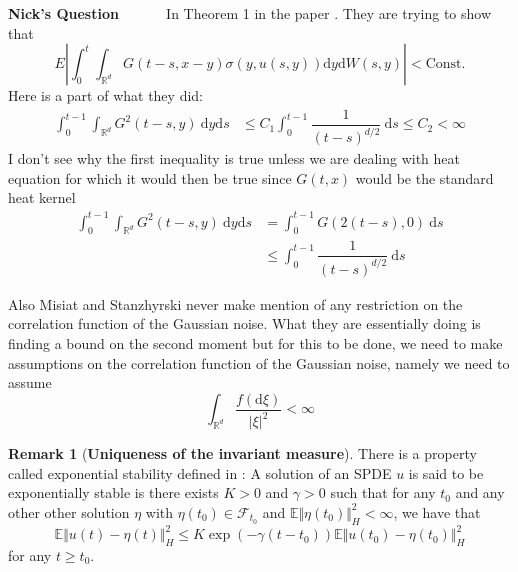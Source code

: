 \documentclass[a4paper,11pt]{article}
\theoremstyle{plain}
\theoremstyle{definition}
\newtheorem{remark}[theorem]{Remark}
\newcommand{\E}{\mathbb{E}}
\newcommand{\ud}{\ensuremath{\mathrm{d}}}
\newcommand{\R}{\mathbb{R}}
\newcounter{NQ}
\newenvironment{NickQuestion}[1][] %
  {\refstepcounter{NQ}
  \begin{mdframed}[backgroundcolor=lightgray]\textbf{Nick's Question \theNQ \: #1~~}~~~\noindent}%
  {\end{mdframed}}
\numberwithin{NQ}{section}
\numberwithin{LQ}{section}
\numberwithin{ZQ}{section}
\begin{document}
\begin{NickQuestion}
In Theorem 1 in the paper \cite{MSY16}. They are trying to show that
$$ E\left|\int_0^t\int_{\R^d}G(t-s,x-y)\sigma(y,u(s,y))\ud y \ud W(s,y)\right| < \text{Const.} $$
Here is a part of what they did:
\begin{align*} 
\int_0^{t-1}\int_{\R^d} G^2(t-s,y) \: \ud y \ud s &\le C_1\int_0^{t-1} \dfrac{1}{(t-s)^{d/2}} \: \ud s \le C_2 < \infty 
\end{align*} 
I don't see why the first inequality is true unless we are dealing with heat equation for which it would then be true since $G(t,x)$ would be the standard heat kernel  
\begin{align*}
    \int_0^{t-1}\int_{\R^d} G^2(t-s,y) \: \ud y \ud s &= \int_0^{t-1} G(2(t-s),0) \: \ud s 
\\ &\le \int_0^{t-1} \dfrac{1}{(t-s)^{d/2}} \: \ud s 
\end{align*}

Also Misiat and Stanzhyrski never make mention of any restriction on the correlation function of the Gaussian noise. What they are essentially doing is finding a bound on the second moment but for this to be done, we need to make assumptions on the correlation function of the Gaussian noise, namely we need to assume 
$$ \int_{\R^d} \dfrac{f(\ud \xi)}{|\xi|^2} < \infty $$
\end{NickQuestion}

\begin{remark}[\textbf{Uniqueness of the invariant measure}]
There is a property called exponential stability defined in \cite{MSY16}: A solution of an SPDE $u$ is said to be exponentially stable is there exists $K>0$ and $\gamma >0$ such that for any $t_0$ and any other other solution $\eta$ with  $\eta(t_0) \in \mathcal F_{t_0}$ and $\E\Vert \eta(t_0) \Vert _H^2 < \infty$, we have that 
$$ \E\Vert u(t)- \eta(t) \Vert _H^2 \le K\exp\left( -\gamma(t-t_0)\right)\E\Vert u(t_0) - \eta(t_0) \Vert _H^2 $$
for any $t \ge t_0$.
\end{remark}
\end{document}
